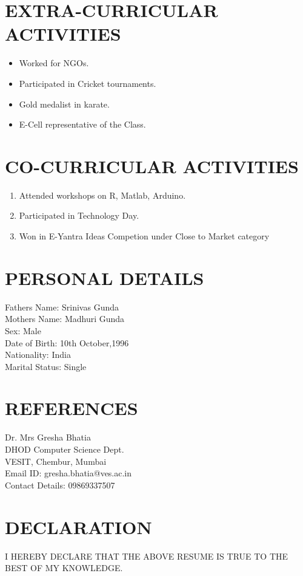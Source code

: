 \documentclass{article}
\begin{document}
\section{EXTRA-CURRICULAR ACTIVITIES}
\begin{itemize}
                \item Worked for NGOs. 
                \item Participated in Cricket tournaments. 
                \item Gold medalist in karate.
                \item E-Cell representative of the Class.
\end{itemize}

\section{CO-CURRICULAR ACTIVITIES}
\begin{enumerate}       
                \item Attended workshops on R, Matlab, Arduino.
                \item Participated in Technology Day.
                \item Won in E-Yantra Ideas Competion under Close to Market category
\end{enumerate}

\section{PERSONAL DETAILS}
{\selectfont
 Fathers Name: Srinivas Gunda
 \\Mothers Name: Madhuri Gunda
 \\Sex: Male
 \\Date of Birth: 10th October,1996
 \\Nationality: India
 \\Marital Status: Single
}
\section{REFERENCES}
{\selectfont
Dr. Mrs Gresha Bhatia
\\DHOD Computer Science Dept.
\\VESIT, Chembur, Mumbai
\\Email ID: gresha.bhatia@ves.ac.in
\\Contact Details: 09869337507
}

\section{DECLARATION}
I HEREBY DECLARE THAT THE ABOVE RESUME IS TRUE TO THE BEST OF MY KNOWLEDGE.
\end{document}
